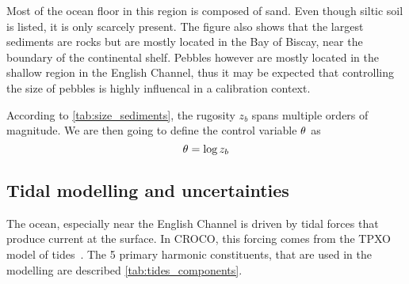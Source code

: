 \documentclass[../../Main_ManuscritThese.tex]{subfiles}
\newcommand{\CROCO}{CROCO}
\newcommand{\zob}{z_b}
\begin{document}
Most of the ocean floor in this region is composed of sand. Even
though siltic soil is listed, it is only scarcely present. The figure
also shows that the largest sediments are rocks but are mostly located
in the Bay of Biscay, near the boundary of the continental
shelf. Pebbles however are mostly located in the shallow region in the
English Channel, thus it may be expected that controlling the size of
pebbles is highly influencal in a calibration context.

According to \cref{tab:size_sediments}, the rugosity $\zob$ spans
multiple orders of magnitude. We are then going to define the control
variable $\theta$ as
\begin{equation}
  \kk = \log \zob
\end{equation}


\subsection{Tidal modelling and uncertainties}
\label{ssec:tidal_modelling}
The ocean, especially near the English Channel is driven by tidal
forces that produce current at the surface. In \CROCO, this forcing comes
from the TPXO model of tides~\cite{egbert_efficient_2002}. The 5
primary harmonic constituents, that are used in the modelling are
described \cref{tab:tides_components}.
\end{document}
